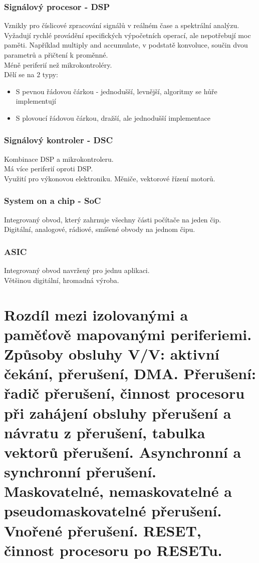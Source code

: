 \subsubsection*{Signálový procesor - DSP}
Vznikly pro číslicové zpracování signálů v reálném čase a spektrální analýzu. \\
Vyžadují rychlé provádění specifických výpočetních operací, ale nepotřebují moc paměti. Například multiply and accumulate, v podstatě konvoluce, součin dvou parametrů a přičtení k proměnné.\\
Méně periferií než mikrokontroléry. \\
Dělí se na 2 typy:
\begin{itemize}
    \item S pevnou řádovou čárkou - jednodušší, levnější, algoritmy se hůře implementují
    \item S plovoucí řádovou čárkou, dražší, ale jednodušší implementace
\end{itemize}

\subsubsection*{Signálový kontroler - DSC}
Kombinace DSP a mikrokontroleru.\\
Má více periferií oproti DSP. \\
Využití pro výkonovou elektroniku. Měniče, vektorové řízení motorů.\\

\subsubsection*{System on a chip - SoC}
Integrovaný obvod, který zahrnuje všechny části počítače na jeden čip. \\
Digitální, analogové, rádiové, smíšené obvody na jednom čipu. \\

\subsubsection*{ASIC}
Integrovaný obvod navržený pro jednu aplikaci.\\
Většinou digitální, hromadná výroba.\\


\section{Rozdíl mezi izolovanými a paměťově mapovanými periferiemi. Způsoby obsluhy V/V: aktivní čekání, přerušení, DMA.
  Přerušení: řadič přerušení, činnost procesoru při zahájení obsluhy přerušení a návratu z přerušení, tabulka vektorů přerušení. Asynchronní a synchronní přerušení. Maskovatelné, nemaskovatelné a pseudomaskovatelné přerušení. Vnořené přerušení. RESET, činnost procesoru po RESETu.}
